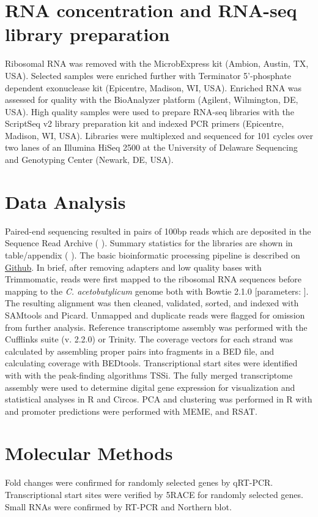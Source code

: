 \section{RNA concentration and RNA-seq library preparation}
Ribosomal RNA was removed with the MicrobExpress kit (Ambion, Austin, TX, USA). Selected samples were enriched further with Terminator 5'-phosphate dependent exonuclease kit (Epicentre, Madison, WI, USA). Enriched RNA was assessed for quality with the BioAnalyzer platform (Agilent, Wilmington, DE, USA). High quality samples were used to prepare RNA-seq libraries with the ScriptSeq v2 library preparation kit and indexed PCR primers (Epicentre, Madison, WI, USA). Libraries were multiplexed and sequenced for 101 cycles over two lanes of an Illumina HiSeq 2500 at the University of Delaware Sequencing and Genotyping Center (Newark, DE, USA).
\section{Data Analysis}
Paired-end sequencing resulted in             pairs of 100bp reads which are deposited in the Sequence Read Archive (          ). Summary statistics for the libraries are shown in table/appendix (        ). The basic bioinformatic processing pipeline is described on \href{https://github.com/mrals89/NGS_scripts/tree/paired}{Github}. In brief, after removing adapters and low quality bases with Trimmomatic, reads were first mapped to the ribosomal RNA sequences before mapping to the \textit{C. acetobutylicum} genome both with Bowtie 2.1.0 [parameters:                ]. The resulting alignment was then cleaned, validated, sorted, and indexed with SAMtools and Picard. Unmapped and duplicate reads were flagged for omission from further analysis. Reference transcriptome assembly was performed with the Cufflinks suite (v. 2.2.0) or Trinity. The coverage vectors for each strand was calculated by assembling proper pairs into fragments in a BED file, and calculating coverage with BEDtools. Transcriptional start sites were identified with with the peak-finding algorithms TSSi. The fully merged transcriptome assembly were used to determine digital gene expression for visualization and statistical analyses in R and Circos. PCA and clustering was performed in R with          and promoter predictions were performed with MEME, and RSAT.
\section{Molecular Methods}
Fold changes were confirmed for randomly selected genes by qRT-PCR. Transcriptional start sites were verified by 5\textprime  RACE for randomly selected genes. Small RNAs were confirmed by RT-PCR and Northern blot.
